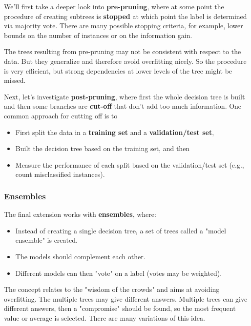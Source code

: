 We'll first take a deeper look into \textbf{pre-pruning}, where at some point the procedure of creating subtrees is \textbf{stopped} at which point the label is determined via majority vote. There are many possible stopping criteria, for example, lower bounds on the number of instances or on the information gain.

The trees resulting from pre-pruning may not be consistent with respect to the data. But they generalize and therefore avoid overfitting nicely. So the procedure is very efficient, but strong dependencies at lower levels of the tree might be missed.

Next, let's investigate \textbf{post-pruning}, where first the whole decision tree is built and then some branches are \textbf{cut-off} that don't add too much information. One common approach for cutting off is to
\begin{itemize}
  \item First split the data in a \textbf{training set} and a \textbf{validation/test set}, 
  \item Built the decision tree based on the training set, and then
  \item Measure the performance of each split based on the validation/test set (e.g., count misclassified instances).
\end{itemize}

\subsubsection*{Ensembles}

The final extension works with \textbf{ensembles}, where:
\begin{itemize}
  \item Instead of creating a single decision tree, a set of trees called a "model ensemble" is created.
  \item The models should complement each other.
  \item Different models can then "vote" on a label (votes may be weighted).
\end{itemize}

The concept relates to the "wisdom of the crowds" and aims at avoiding overfitting. The multiple trees may give different answers. Multiple trees can give different answers, then a "compromise" should be found, so the most frequent value or average is selected. There are many variations of this idea.

